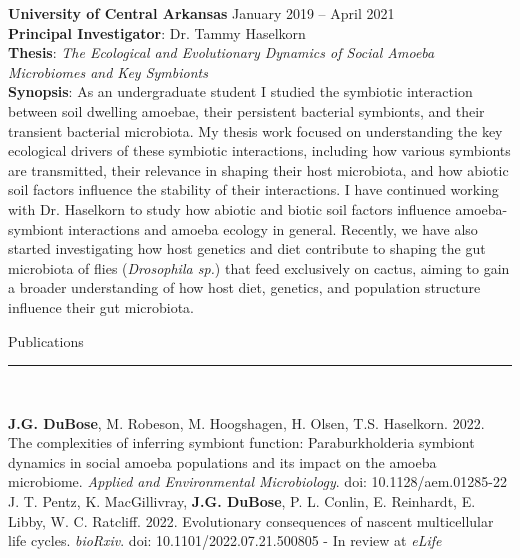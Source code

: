 \documentclass{article}
\begin{document}
\noindent \textbf{University of Central Arkansas} \hfill January 2019 – April 2021\\
\textbf{Principal Investigator}: Dr. Tammy Haselkorn\\
\textbf{Thesis}: \emph{The Ecological and Evolutionary Dynamics of Social Amoeba Microbiomes and Key Symbionts} \\
\textbf{Synopsis}: As an undergraduate student I studied the symbiotic interaction between soil dwelling amoebae, their persistent bacterial symbionts, 
and their transient bacterial microbiota. My thesis work focused on understanding the key ecological drivers of these symbiotic interactions, 
including how various symbionts are transmitted, their relevance in shaping their host microbiota, and how abiotic soil factors influence the stability of their interactions. 
I have continued working with Dr. Haselkorn to study how abiotic and biotic soil factors influence amoeba-symbiont interactions and amoeba ecology in general. 
Recently, we have also started investigating how host genetics and diet contribute to shaping the gut microbiota of flies (\emph{Drosophila sp.}) 
that feed exclusively on cactus, aiming to gain a broader understanding of how host diet, genetics, and population structure influence their gut microbiota.\\

\begin{flushleft}
{\Large Publications} \rule{16.51cm}{0.4pt}\\
\end{flushleft}
\hangindent=0.7cm \textbf{J.G. DuBose}, M. Robeson, M. Hoogshagen, H. Olsen, T.S. Haselkorn. 2022. The complexities of inferring symbiont function: Paraburkholderia symbiont dynamics in social amoeba populations and its impact on the amoeba microbiome. \emph{Applied and Environmental Microbiology}. doi: 10.1128/aem.01285-22 \\

\hangindent=0.7cm J. T. Pentz, K. MacGillivray, \textbf{J.G. DuBose}, P. L. Conlin, E. Reinhardt, E. Libby, W. C. Ratcliff. 2022. Evolutionary consequences of nascent multicellular life cycles. \emph{bioRxiv}. doi: 10.1101/2022.07.21.500805 - In review at \emph{eLife} \\
\end{document}
